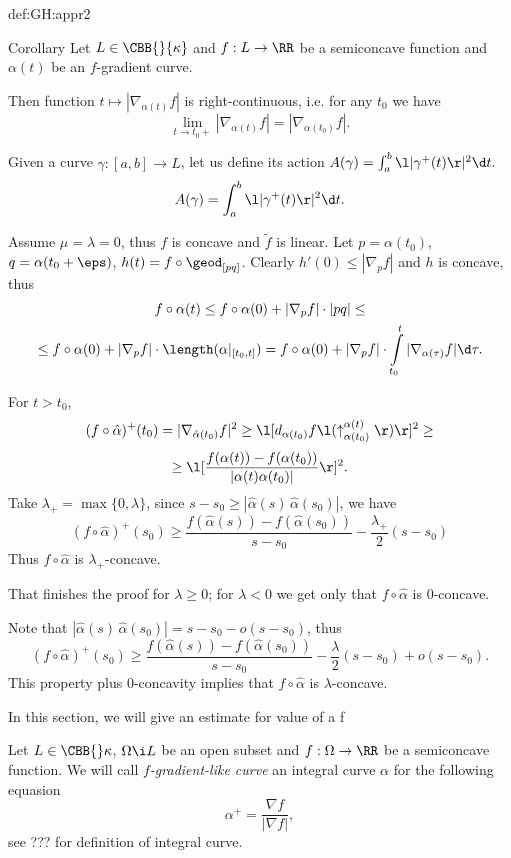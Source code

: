 {\begin{subthm}{def:GH:appr2}
\begin{thm}{Corollary}
Let $L\in\CBB{}{\kappa}$ and $f:L\to \RR$ be a
semiconcave function and $\alpha(t)$ be an $f$-gradient curve.

Then function
$t\mapsto |\nabla_{\alpha(t)}f|$
is right-continuous, i.e. for any $t_0$ we have
$$\lim_{t\to t_0+} |\nabla_{\alpha(t)}f|=|\nabla_{\alpha(t_0)}f|.$$
\end{thm}

Given a curve $\gamma:[a,b]\to L$, let us define its action $A(\gamma)=\int_a^b\l|\gamma^+(t)\r|^2\d t.$
$$A(\gamma)=\int_a^b\l|\gamma^+(t)\r|^2\d t.$$

 Assume $\mu=\lambda=0$, thus $f$ is concave and $\tilde f$ is linear.
Let $p=\alpha(t_0)$, $q=\alpha(t_0+\eps)$, $h(t)=f\circ\geod_{[pq]}$.
Clearly $h'(0)\le|\nabla_pf|$ and $h$ is concave,
thus 
\begin{multline*}
f\circ\alpha(t)\le
f\circ\alpha(0)+|\nabla_pf|\cdot|pq|
\le
\\
\le
f\circ\alpha(0)+|\nabla_pf|\cdot\length(\alpha|_{[t_0,t]})=f\circ\alpha(0)+|\nabla_pf|\cdot\int\limits_{t_0}^t|\nabla_{\alpha(\tau)}f|\d\tau.
\end{multline*}



For $t>t_0$,
$$(f\circ\hat\alpha)^+(t_0)=|\nabla_{\hat\alpha(t_0)}f|^2
\ge
\l[d_{\alpha(t_0)}f\l(\uparrow_{\alpha(t_0)}^{\alpha(t)}\r)\r]^2
\ge
$$
$$
\ge\l[\frac{f(\alpha(t))-f(\alpha(t_0))}
{|\alpha(t)\alpha(t_0)|}\r]^2
.$$
Take $\lambda_+=\max\{0,\lambda\}$, since $s-s_0\ge|\hat\alpha(s)\,\hat\alpha(s_0)|$, we
have 
$$(f\circ\hat\alpha)^+(s_0)\ge
\frac{f(\hat\alpha(s))-f(\hat\alpha(s_0))}{s-s_0}-\frac{\lambda_+}2(s-s_0)$$
Thus $f\circ\hat\alpha$ is $\lambda_+$-concave.

That finishes the proof for $\lambda\ge 0$; for $\lambda<0$ we get only that $f\circ\hat\alpha$ is $0$-concave.

Note that $|\hat\alpha(s)\,\hat\alpha(s_0)|=s-s_0-o(s-s_0)$, thus
$$(f\circ\hat\alpha)^+(s_0)\ge
\frac{f(\hat\alpha(s))-f(\hat\alpha(s_0))}{s-s_0} -\frac\lambda2(s-s_0)+o(s-s_0).$$
This property plus $0$-concavity implies that $f\circ\hat\alpha$ is  $\lambda$-concave.\qeds  


 
In this section, we will give an estimate for value of a f

Let $L\in \CBB{}\kappa$, $\Omega\i L$ be an open subset and $f:\Omega\to\RR$ be a semiconcave function.
We will call \emph{$f$-gradient-like curve} an integral curve $\alpha$ for the following equasion
$$\alpha^+=\frac{\nabla f}{|\nabla f|},$$
see ??? for definition of integral curve.


\end{subthm}}
